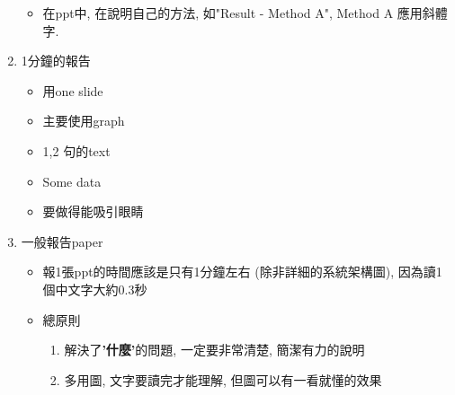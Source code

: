 \begin{enumerate}
{\begin{itemize}
      \item
      {
        在ppt中, 在說明自己的方法, 如"Result - Method A", Method A 應用斜體字.
      } %

    \end{itemize}
  } %

  \item
  {
      1分鐘的報告
    \begin{itemize}
      \item
      {
        用one slide
      } %

      \item
      {
        主要使用graph
      } %

      \item
      {
        1,2 句的text
      } %

      \item
      {
        Some data
      } %

      \item
      {
        要做得能吸引眼睛
      } %
    \end{itemize}
  } %

  \item
  {
    一般報告paper
    \begin{itemize}
      \item
      {
        報1張ppt的時間應該是只有1分鐘左右 (除非詳細的系統架構圖), 因為讀1個中文字大約0.3秒
      } %

      \item
      {
        總原則
        \begin{enumerate}
          \item
          {
            解決了\textbf{'什麼'}的問題, 一定要非常清楚, 簡潔有力的說明
          } %

          \item
          {
            多用圖, 文字要讀完才能理解, 但圖可以有一看就懂的效果
          } %
        \end{enumerate}
      } %


\end{itemize}}
\end{enumerate}
